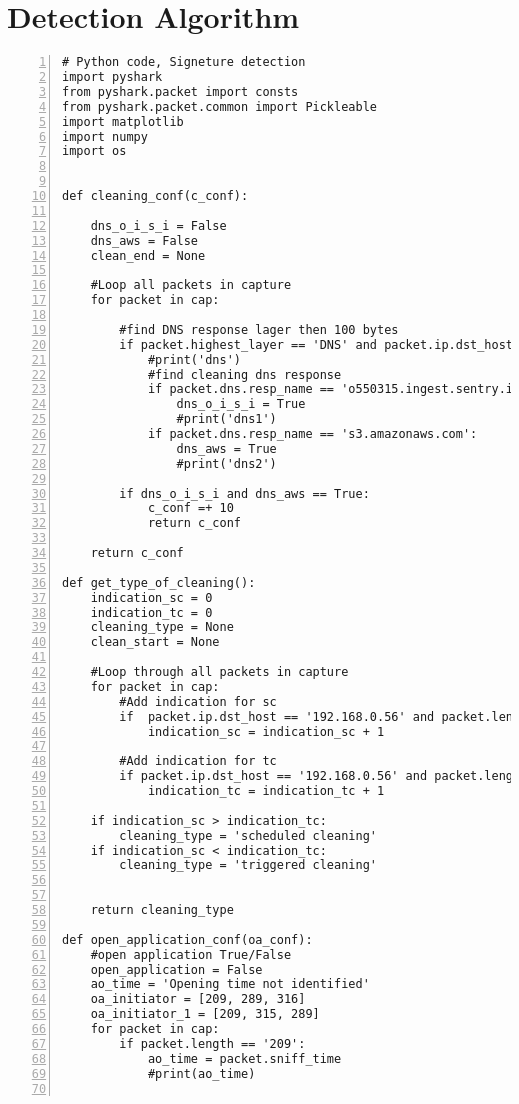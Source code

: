 \chapter{Detection Algorithm}
\label{app:DetectionAlgorithm}

\begin{lstlisting}[numbers=left]
# Python code, Signeture detection
import pyshark
from pyshark.packet import consts
from pyshark.packet.common import Pickleable
import matplotlib
import numpy
import os


def cleaning_conf(c_conf):
    
    dns_o_i_s_i = False
    dns_aws = False
    clean_end = None
    
    #Loop all packets in capture
    for packet in cap:

        #find DNS response lager then 100 bytes 
        if packet.highest_layer == 'DNS' and packet.ip.dst_host == wan_addr:
            #print('dns')
            #find cleaning dns response
            if packet.dns.resp_name == 'o550315.ingest.sentry.io':
                dns_o_i_s_i = True
                #print('dns1')
            if packet.dns.resp_name == 's3.amazonaws.com':
                dns_aws = True
                #print('dns2')
    
        if dns_o_i_s_i and dns_aws == True:
            c_conf =+ 10
            return c_conf

    return c_conf

def get_type_of_cleaning():
    indication_sc = 0
    indication_tc = 0
    cleaning_type = None
    clean_start = None

    #Loop through all packets in capture
    for packet in cap:
        #Add indication for sc
        if  packet.ip.dst_host == '192.168.0.56' and packet.length == ('1101' or '1107'):
            indication_sc = indication_sc + 1
            
        #Add indication for tc
        if packet.ip.dst_host == '192.168.0.56' and packet.length == ('1105' or '1106' or '1099'):
            indication_tc = indication_tc + 1

    if indication_sc > indication_tc:
        cleaning_type = 'scheduled cleaning'
    if indication_sc < indication_tc:
        cleaning_type = 'triggered cleaning'
    

    return cleaning_type

def open_application_conf(oa_conf):
    #open application True/False
    open_application = False
    ao_time = 'Opening time not identified'
    oa_initiator = [209, 289, 316]
    oa_initiator_1 = [209, 315, 289]
    for packet in cap:
        if packet.length == '209':
            ao_time = packet.sniff_time
            #print(ao_time)
    

\end{lstlisting}
